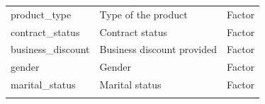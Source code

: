 \documentclass[
]{article}
\begin{document}
\begin{longtable}[]{@{}lll@{}}
\begin{minipage}[t]{0.30\columnwidth}\raggedright
product\_type\strut
\end{minipage} & \begin{minipage}[t]{0.30\columnwidth}\raggedright
Type of the product\strut
\end{minipage} & \begin{minipage}[t]{0.30\columnwidth}\raggedright
Factor\strut
\end{minipage}\tabularnewline
\begin{minipage}[t]{0.30\columnwidth}\raggedright
contract\_status\strut
\end{minipage} & \begin{minipage}[t]{0.30\columnwidth}\raggedright
Contract status\strut
\end{minipage} & \begin{minipage}[t]{0.30\columnwidth}\raggedright
Factor\strut
\end{minipage}\tabularnewline
\begin{minipage}[t]{0.30\columnwidth}\raggedright
business\_discount\strut
\end{minipage} & \begin{minipage}[t]{0.30\columnwidth}\raggedright
Business discount provided\strut
\end{minipage} & \begin{minipage}[t]{0.30\columnwidth}\raggedright
Factor\strut
\end{minipage}\tabularnewline
\begin{minipage}[t]{0.30\columnwidth}\raggedright
gender\strut
\end{minipage} & \begin{minipage}[t]{0.30\columnwidth}\raggedright
Gender\strut
\end{minipage} & \begin{minipage}[t]{0.30\columnwidth}\raggedright
Factor\strut
\end{minipage}\tabularnewline
\begin{minipage}[t]{0.30\columnwidth}\raggedright
marital\_status\strut
\end{minipage} & \begin{minipage}[t]{0.30\columnwidth}\raggedright
Marital status\strut
\end{minipage} & \begin{minipage}[t]{0.30\columnwidth}\raggedright
Factor\strut
\end{minipage}\tabularnewline
\begin{minipage}[t]{0.30\columnwidth}\raggedright

\end{minipage}
\end{longtable}
\end{document}
